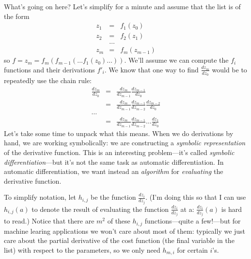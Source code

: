 \documentclass[12pt]{article}
\newcommand{\trm}[1]{\textit{#1}}
\newcommand{\deriv}[2]{\frac{d{}#1}{d{}#2}}
\begin{document}
What's going on here? Let's simplify for a minute and assume that the
list is of the form
\begin{eqnarray*}
 z_1 & = &  f_1(z_0) \\
 z_2 & = &  f_2(z_1) \\
 & \ldots & \\
 z_m & = &  f_m(z_{m-1})
\end{eqnarray*}
so $f = z_m = f_m(f_{m-1}(\ldots f_1(z_0) \ldots))$.  We'll assume we
can compute the $f_i$ functions and their derivations $f'_i$.  We know
that one way to find $\deriv{z_m}{z_0}$ would be to repeatedly use the
chain rule:
\begin{eqnarray*}
\deriv{z_m}{z_0} & = & \deriv{z_m}{z_{m-1}} \deriv{z_{m-1}}{z_0} \\
                 & = & \deriv{z_m}{z_{m-1}} \deriv{z_{m-1}}{z_{m-2}} \deriv{z_{m-2}}{z_{0}} \\
 \ldots \\
                 & = &  \deriv{z_m}{z_{m-1}} \deriv{z_{m-1}}{z_{m-2}} \ldots \deriv{z_{1}}{z_{0}}
\end{eqnarray*}
Let's take some time to unpack what this means.  When we do
derivations by hand, we are working symbolically: we are constructing
a \emph{symbolic representation} of the derivative function.  This is
an interesting problem---it's called \trm{symbolic
  differentiation}---but it's not the same task as automatic
differentiation.  In automatic differentiation, we want instead an
\emph{algorithm} for \emph{evaluating} the derivative function.

To simplify notation, let $h_{i,j}$ be the function
$\deriv{z_i}{z_j}$.  (I'm doing this so that I can use $h_{i,j}(a)$ to
denote the result of evaluating the function $\deriv{z_i}{z_j}$ at a:
$\deriv{z_i}{z_j}(a)$ is hard to read.)  Notice that there are $m^2$
of these $h_{i,j}$ functions---quite a few!---but for machine learing
applications we won't care about most of them: typically we just care
about the partial derivative of the cost function (the final variable
in the list) with respect to the parameters, so we only need $h_{m,i}$
for certain $i$'s.
\end{document}
